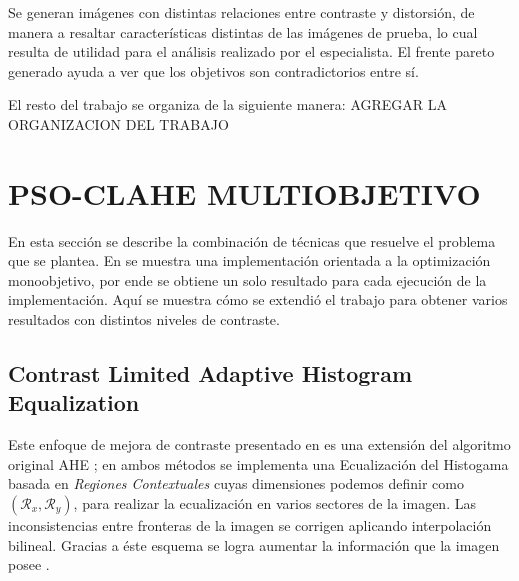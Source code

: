 \documentclass[spanish,twocolumn]{article}
\begin{document}
Se generan imágenes con distintas relaciones entre contraste y distorsión, de manera a resaltar características distintas de las imágenes de prueba, lo cual resulta de utilidad para el análisis realizado por el especialista. El frente pareto generado ayuda a ver que los objetivos son contradictorios entre sí.

El resto del trabajo se organiza de la siguiente manera: {\color{red} AGREGAR LA ORGANIZACION DEL TRABAJO}




\section{PSO-CLAHE MULTIOBJETIVO}
\label{sec:psoclahe}

En esta sección se describe la combinación de técnicas que resuelve el problema que se plantea. En \cite{morebrizuela2014} se muestra una implementación orientada a la optimización monoobjetivo, por ende se obtiene un solo resultado para cada ejecución de la implementación. Aquí se muestra cómo se extendió el trabajo para obtener varios resultados con distintos niveles de contraste.

\subsection{Contrast Limited Adaptive Histogram Equalization}

Este enfoque de mejora de contraste presentado en \cite{Zuiderveld:1994:CLA:180895.180940} es una extensión del algoritmo original AHE \cite{pizer1987adaptive}; en ambos métodos se implementa una Ecualización del Histogama basada en {\it Regiones Contextuales} cuyas dimensiones podemos definir como  $(\mathcal{R}_x, \mathcal{R}_y)$, para realizar la ecualización en varios sectores de la imagen. Las inconsistencias entre fronteras de la imagen se corrigen aplicando interpolación bilineal. Gracias a éste esquema se logra aumentar la información que la imagen posee \cite{zimmerman1988evaluation}.
\end{document}
